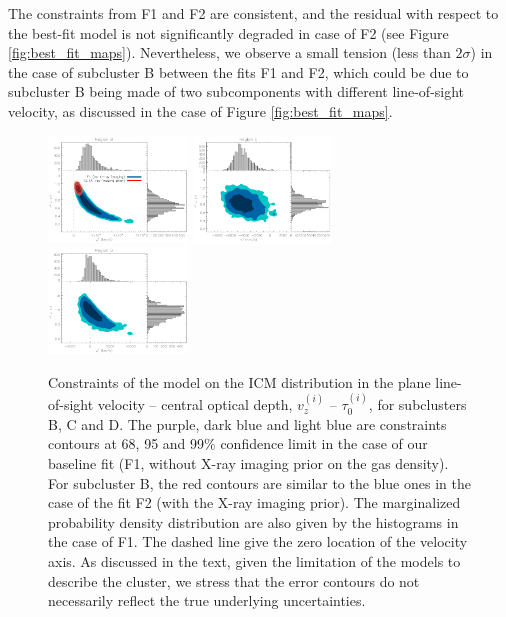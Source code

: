 \documentclass[twocolumn,traditabstract]{aa}
\begin{document}
The constraints from F1 and F2 are consistent, and the residual with respect to the best-fit model is not significantly degraded in case of F2 (see Figure \ref{fig:best_fit_maps}). Nevertheless, we observe a small tension (less than $2 \sigma$) in the case of subcluster B between the fits F1 and F2, which could be due to subcluster B being made of two subcomponents with different line-of-sight velocity, as discussed in the case of Figure \ref{fig:best_fit_maps}.
\begin{figure}[h]
\centering
\includegraphics[width=0.33\textwidth]{Figure/Tau_vz_2dLikelihoods_B.pdf}
\includegraphics[width=0.33\textwidth]{Figure/Tau_vz_2dLikelihoods_C.pdf}
\includegraphics[width=0.33\textwidth]{Figure/Tau_vz_2dLikelihoods_D.pdf}
\caption{\footnotesize{Constraints of the model on the ICM distribution in the plane line-of-sight velocity -- central optical depth, $v_z^{(i)}$ -- $\tau_0^{(i)}$, for subclusters B, C and D. The purple, dark blue and light blue are constraints contours at 68, 95 and 99\% confidence limit in the case of our baseline fit (F1, without X-ray imaging prior on the gas density). For subcluster B, the red contours are similar to the blue ones in the case of the fit F2 (with the X-ray imaging prior). The marginalized probability density distribution are also given by the histograms in the case of F1. The dashed line give the zero location of the velocity axis. As discussed in the text, given the limitation of the models to describe the cluster, we stress that the error contours do not necessarily reflect the true underlying uncertainties.}}
\label{fig:velocity_constraint}
\end{figure}
\end{document}
